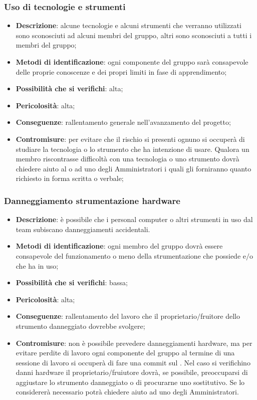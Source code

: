		\subsubsection{Uso di tecnologie e strumenti}
			\begin{itemize}
				\item \textbf{Descrizione}: alcune tecnologie e alcuni strumenti che verranno utilizzati sono sconosciuti ad alcuni membri del gruppo, altri sono sconosciuti a tutti i membri del gruppo; 
				\item \textbf{Metodi di identificazione}: ogni componente del gruppo sarà consapevole delle proprie conoscenze e dei propri limiti in fase di apprendimento;
				\item \textbf{Possibilità che si verifichi}: alta;
				\item \textbf{Pericolosità}: alta;
				\item \textbf{Conseguenze}: rallentamento generale nell'avanzamento del progetto;
				\item \textbf{Contromisure}:  per evitare che il rischio si presenti ognuno si occuperà di studiare la tecnologia o lo strumento che ha intenzione di usare. Qualora un membro riscontrasse difficoltà con una tecnologia o uno strumento dovrà chiedere aiuto al \RES{} o ad uno degli Amministratori i quali gli forniranno quanto richiesto in forma scritta o verbale;
			\end{itemize}	
		
		\subsubsection{Danneggiamento strumentazione hardware}
			\begin{itemize}
				\item \textbf{Descrizione}: è possibile che i personal computer o altri strumenti in uso dal team subiscano danneggiamenti accidentali.
				\item \textbf{Metodi di identificazione}: ogni membro del gruppo dovrà essere consapevole del funzionamento o meno della strumentazione che possiede e$/$o che ha in uso;
				\item \textbf{Possibilità che si verifichi}: bassa;
				\item \textbf{Pericolosità}: alta;
				\item \textbf{Conseguenze}: rallentamento del lavoro che il proprietario$/$fruitore dello strumento danneggiato dovrebbe svolgere;
				\item \textbf{Contromisure}: non è possibile prevedere danneggiamenti hardware, ma per evitare perdite di lavoro ogni componente del gruppo al termine di una sessione di lavoro si occuperà di fare una commit sul . Nel caso si verifichino danni hardware il proprietario$/$fruiutore dovrà, se possibile, preoccuparsi di aggiustare lo strumento danneggiato o di procurarne uno sostitutivo. Se lo considererà necessario potrà chiedere aiuto ad uno degli Amministratori.
			\end{itemize}
		
